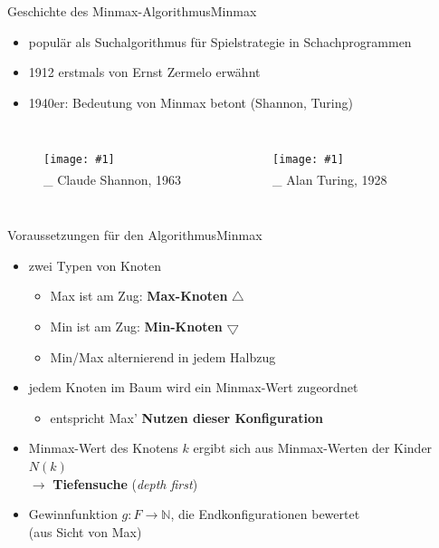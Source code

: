 \documentclass[18pt, aspectratio=169]{beamer}
\newcommand\citeh[1]{\textsuperscript{\cite{#1}}}
\newcommand\g[3]{%
  \begin{figure}[!ht]
  \centering
  \texttt{[image: \#1]}
  {\small#3}
  \end{figure}}
\begin{document}
\begin{frame}{Geschichte des Minmax-Algorithmus}{Minmax}
	\begin{itemize}
		\item populär als Suchalgorithmus für Spielstrategie in Schachprogrammen
		\item 1912 erstmals von Ernst Zermelo erwähnt
		\item 1940er: Bedeutung von Minmax betont (Shannon, Turing)
	\end{itemize}

  \begin{columns}
	  \g{img/shannon.jpg}{0.35}{\\\_ Claude Shannon, 1963\citeh{img_shannon}}
	  
	  \g{img/turing.jpg}{0.35}{\\\_ Alan Turing, 1928\citeh{img_turing}}

  \end{columns}
\end{frame}

\begin{frame}{Voraussetzungen für den Algorithmus}{Minmax}
	\begin{itemize}
	\item
	  zwei Typen von Knoten
	  \pause
	  \begin{itemize}
	  	\item Max ist am Zug: \textbf{Max-Knoten} \quad $\bigtriangleup$
	  	\item Min ist am Zug: \textbf{Min-Knoten} \quad $\bigtriangledown$
		  \item Min/Max alternierend in jedem Halbzug
  	\end{itemize}
  	\pause
  	\item jedem Knoten im Baum wird ein Minmax-Wert zugeordnet
  	\begin{itemize}
  		\item entspricht Max' \textbf{Nutzen dieser Konfiguration}
		\end{itemize}
		\pause
		\item Minmax-Wert des Knotens $k$ ergibt sich aus Minmax-Werten der Kinder $N(k)$\\ $\rightarrow$ \textbf{Tiefensuche} (\textit{depth first})
		\pause
		\item Gewinnfunktion $g: F \to \mathbb{N}$, die Endkonfigurationen bewertet\\(aus Sicht von Max)
	\end{itemize}
\end{frame}
\end{document}

